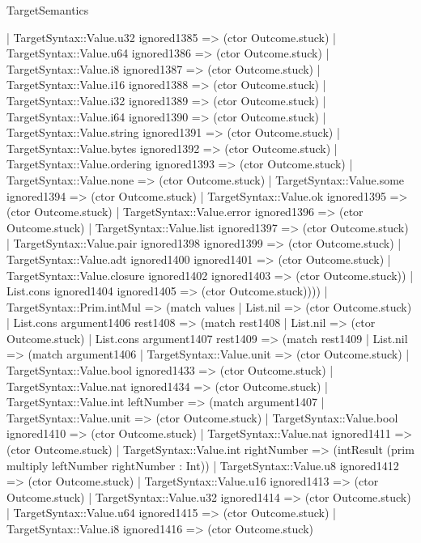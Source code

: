 \begin{lexlean}{TargetSemantics}
\begin{semanticmodule}
{            | TargetSyntax::Value.u32 ignored1385 => (ctor Outcome.stuck)
            | TargetSyntax::Value.u64 ignored1386 => (ctor Outcome.stuck)
            | TargetSyntax::Value.i8 ignored1387 => (ctor Outcome.stuck)
            | TargetSyntax::Value.i16 ignored1388 => (ctor Outcome.stuck)
            | TargetSyntax::Value.i32 ignored1389 => (ctor Outcome.stuck)
            | TargetSyntax::Value.i64 ignored1390 => (ctor Outcome.stuck)
            | TargetSyntax::Value.string ignored1391 => (ctor Outcome.stuck)
            | TargetSyntax::Value.bytes ignored1392 => (ctor Outcome.stuck)
            | TargetSyntax::Value.ordering ignored1393 => (ctor Outcome.stuck)
            | TargetSyntax::Value.none => (ctor Outcome.stuck)
            | TargetSyntax::Value.some ignored1394 => (ctor Outcome.stuck)
            | TargetSyntax::Value.ok ignored1395 => (ctor Outcome.stuck)
            | TargetSyntax::Value.error ignored1396 => (ctor Outcome.stuck)
            | TargetSyntax::Value.list ignored1397 => (ctor Outcome.stuck)
            | TargetSyntax::Value.pair ignored1398 ignored1399 => (ctor Outcome.stuck)
            | TargetSyntax::Value.adt ignored1400 ignored1401 => (ctor Outcome.stuck)
            | TargetSyntax::Value.closure ignored1402 ignored1403 => (ctor Outcome.stuck))
          | List.cons ignored1404 ignored1405 => (ctor Outcome.stuck))))
    | TargetSyntax::Prim.intMul => (match values
      | List.nil => (ctor Outcome.stuck)
      | List.cons argument1406 rest1408 => (match rest1408
        | List.nil => (ctor Outcome.stuck)
        | List.cons argument1407 rest1409 => (match rest1409
          | List.nil => (match argument1406
            | TargetSyntax::Value.unit => (ctor Outcome.stuck)
            | TargetSyntax::Value.bool ignored1433 => (ctor Outcome.stuck)
            | TargetSyntax::Value.nat ignored1434 => (ctor Outcome.stuck)
            | TargetSyntax::Value.int leftNumber => (match argument1407
              | TargetSyntax::Value.unit => (ctor Outcome.stuck)
              | TargetSyntax::Value.bool ignored1410 => (ctor Outcome.stuck)
              | TargetSyntax::Value.nat ignored1411 => (ctor Outcome.stuck)
              | TargetSyntax::Value.int rightNumber => (intResult (prim multiply leftNumber rightNumber : Int))
              | TargetSyntax::Value.u8 ignored1412 => (ctor Outcome.stuck)
              | TargetSyntax::Value.u16 ignored1413 => (ctor Outcome.stuck)
              | TargetSyntax::Value.u32 ignored1414 => (ctor Outcome.stuck)
              | TargetSyntax::Value.u64 ignored1415 => (ctor Outcome.stuck)
              | TargetSyntax::Value.i8 ignored1416 => (ctor Outcome.stuck)
}
\end{semanticmodule}
\end{lexlean}
